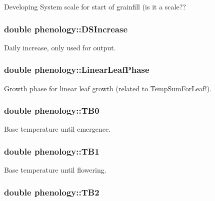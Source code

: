 Developing System scale for start of grainfill (is it a scale?? \hypertarget{classphenology_af7652af43dd671f63d32f95b740a6228}{
\subsubsection[{DSIncrease}]{\setlength{\rightskip}{0pt plus 5cm}double {\bf phenology::DSIncrease}}}
\label{classphenology_af7652af43dd671f63d32f95b740a6228}


Daily increase, only used for output. \hypertarget{classphenology_a88c5292d2d713236a2403cb0a100655c}{
\subsubsection[{LinearLeafPhase}]{\setlength{\rightskip}{0pt plus 5cm}double {\bf phenology::LinearLeafPhase}}}
\label{classphenology_a88c5292d2d713236a2403cb0a100655c}


Growth phase for linear leaf growth (related to TempSumForLeaf!). \hypertarget{classphenology_a11a737c8b597846f9c2f3830c9730fa5}{
\subsubsection[{TB0}]{\setlength{\rightskip}{0pt plus 5cm}double {\bf phenology::TB0}}}
\label{classphenology_a11a737c8b597846f9c2f3830c9730fa5}


Base temperature until emergence. \hypertarget{classphenology_a9402604c0ae15b2e4a38817117438b82}{
\subsubsection[{TB1}]{\setlength{\rightskip}{0pt plus 5cm}double {\bf phenology::TB1}}}
\label{classphenology_a9402604c0ae15b2e4a38817117438b82}


Base temperature until flowering. \hypertarget{classphenology_a1e71f980392540030063ddb992724422}{
\subsubsection[{TB2}]{\setlength{\rightskip}{0pt plus 5cm}double {\bf phenology::TB2}}}
\label{classphenology_a1e71f980392540030063ddb992724422}


